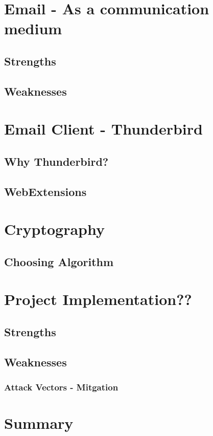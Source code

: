 \documentclass[12pt,a4paper]{article}
\begin{document}
\section{Email - As a communication medium}
\subsection{Strengths}
\subsection{Weaknesses}

\section{Email Client - Thunderbird}
\subsection{Why Thunderbird?}
\subsection{WebExtensions}

\section{Cryptography}
\subsection{Choosing Algorithm}

\section{Project Implementation??}
\subsection{Strengths}
\subsection{Weaknesses}
\subsubsection{Attack Vectors - Mitgation}

\section{Summary}
\end{document}
